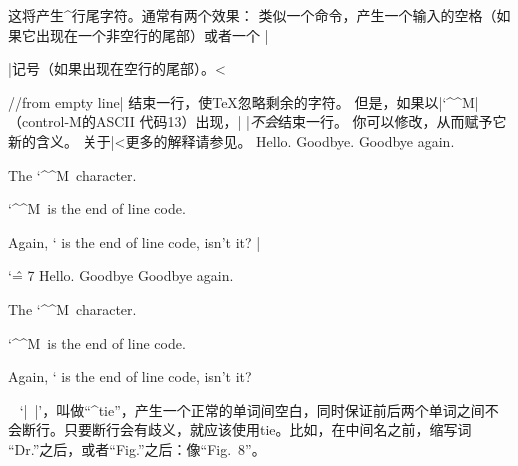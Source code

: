\begindesc
\ctsact  ^^M 
\explain
这将产生^{行尾}字符。通常有两个效果：
\olist
\li 类似一个命令，产生一个输入的空格（如果它出现在一个非空行的尾部）或者一个
|\par|记号（如果出现在空行的尾部）。^^|\par//from empty line|
\li 结束一行，使\TeX{}忽略剩余的字符。
\endolist
\noindent
但是，如果以|`\^^M|（control-M的ASCII 代码13）出现，|^^M|\emph{不会}结束一行。
你可以修改，从而赋予它新的含义。
关于|^^|更多的解释请参见。
\example
Hello.^^MGoodbye.
Goodbye again.\par
The \char `\^^M\ character.\par
\number `\^^M\ is the end of line code.\par
Again, \number `^^M is the end of line code,
isn't it? %
|
\produces
{\catcode `\^ = 7 %
Hello.^^MGoodbye
Goodbye again.\par
The \char `\^^M\ character.\par
\number `\^^M\ is the end of line code.\par
Again, \number `^^M is the end of line code,
isn't it?}
\endexample
\enddesc

%


\begindesc
\easy\ctsact ~ 
\explain
{}`|~|'，叫做``^{tie}''，产生一个正常的单词间空白，同时保证前后两个单词之间不会断行。只要断行会有歧义，就应该使用tie。比如，在中间名之前，缩写词
``Dr.''之后，或者``Fig.''之后：像``Fig.~8''。

